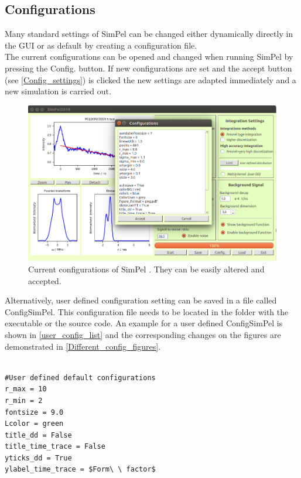 \documentclass[pdftex,bezier,german,a4,twoside, headexclude,12pt,nochapterprefix, titlepage]{extarticle}
\newcommand{\simpel}{\textsf{SimPel} }
\begin{document}
\subsection{Configurations}
Many standard settings of \simpel can be changed either dynamically directly in the GUI or as default by creating a
configuration file.\\
The current configurations can be opened and changed when running  \simpel by pressing the Config. button.
If new configurations are set and the accept button (see \autoref{Config_settings})
is clicked the new settings are adapted immediately and a new simulation is carried out.
\begin{figure}[!htb]
\centering
\includegraphics[scale=0.5]{Config_example.png}
    \caption{Current configurations of  \simpel. They can be easily altered and accepted.}
   \label{Config_settings}
\end{figure}
Alternatively, user defined configuration setting can be saved in a file called ConfigSimPel. This configuration file
needs to be located in the folder with the executable or the source code. An example for a user defined Config\simpel is
shown in \autoref{user_config_list} and the corresponding changes on the figures are demonstrated in \autoref{Different_config_figures}.
\newpage
\begin{lstlisting}[caption={Example for a user defined configuration file (ConfigSimPel).},label = user_config_list]

#User defined default configurations 
r_max = 10
r_min = 2
fontsize = 9.0
Lcolor = green
title_dd = False
title_time_trace = False
yticks_dd = True
ylabel_time_trace = $Form\ \ factor$
\end{lstlisting}
\end{document}
